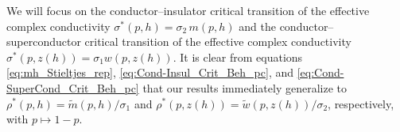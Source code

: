 \documentclass[english,12pt,jmp,graphicx]{revtex4-1}
\begin{document}
%
We will focus on the conductor--insulator critical transition of the
effective complex conductivity $\sigma^*(p,h)=\sigma_2\,m(p,h)$ and the
conductor--superconductor critical transition of the effective
complex conductivity $\sigma^*(p,z(h))=\sigma_1w(p,z(h))$. It is clear from equations
\eqref{eq:mh_Stieltjes_rep}, \eqref{eq:Cond-Insul_Crit_Beh_pc}, and
\eqref{eq:Cond-SuperCond_Crit_Beh_pc} 
that our results immediately generalize to
$\rho^*(p,h)=\tilde{m}(p,h)/\sigma_1$ and
$\rho^*(p,z(h))=\tilde{w}(p,z(h))/\sigma_2$, respectively, with
$p\mapsto1-p$.
\end{document}
